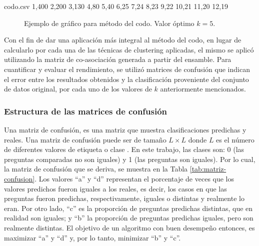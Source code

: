 \begin{filecontents*}{codo.csv}
1,400
2,200
3,130
4,80
5,40
6,25
7,24
8,23
9,22
10,21
11,20
12,19
\end{filecontents*}

\begin{figure}
	\centering
	\scriptsize
	\caption{Ejemplo de gráfico para método del codo. Valor óptimo \(k = 5\).}
	\label{fig:codo}
\end{figure}

\bigskip Con el fin de dar una aplicación más integral al método del codo, en lugar de calcularlo por cada una de las técnicas de clustering aplicadas, el mismo se aplicó utilizando la matriz de co-asociación generada a partir del ensamble. Para cuantificar y evaluar el rendimiento, se utilizó matrices de confusión que indican el error entre los resultados obtenidos y la clasificación proveniente del conjunto de datos original, por cada uno de los valores de \(k\) anteriormente mencionados.

\subsubsection{Estructura de las matrices de confusión}\label{estructurasconfusion}
Una matriz de confusión, es una matriz que muestra clasificaciones predichas y reales. Una matriz de confusión puede ser de tamaño \(L \times L\) donde \(L\) es el número de diferentes valores de etiqueta o clase \citep{provost1998glossary}. En este trabajo, las clases son: 0 (las preguntas comparadas no son iguales) y 1 (las preguntas son iguales). Por lo cual, la matriz de confusión que se deriva, se muestra en la Tabla \ref{tab:matriz-confusion}. Los valores “a” y “d” representan el porcentaje de veces que los valores predichos fueron iguales a los reales, es decir, los casos en que las preguntas fueron predichas, respectivamente, iguales o distintas y realmente lo eran. Por otro lado, “c” es la proporción de preguntas predichas distintas, que en realidad son iguales; y “b” la proporción de preguntas predichas iguales, pero son realmente distintas. El objetivo de un algoritmo con buen desempeño entonces, es maximizar “a” y “d” y, por lo tanto, minimizar “b” y “c”.

